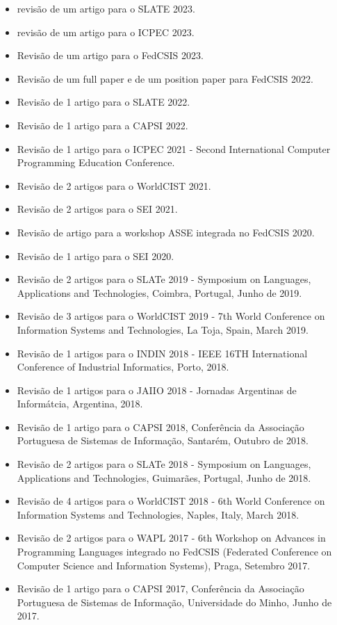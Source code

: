 \documentclass[11pt]{article}
\begin{document}
\begin{itemize}
\item{revisão de um artigo para o SLATE 2023.}
\item{revisão de um artigo para o ICPEC 2023.}
\item{Revisão de um artigo para o FedCSIS 2023.}
\item{Revisão de um full paper e de um position paper para FedCSIS 2022.}
\item{Revisão de 1 artigo para o SLATE 2022.}
\item{Revisão de 1 artigo para a CAPSI 2022.}
\item{Revisão de 1 artigo para o ICPEC 2021 - Second International Computer Programming Education Conference.}
\item{Revisão de 2 artigos para o WorldCIST 2021.}
\item{Revisão de 2 artigos para o SEI 2021.}
\item{Revisão de artigo para a workshop ASSE integrada no FedCSIS 2020.}
\item{Revisão de 1 artigo para o SEI 2020.}
\item{Revisão de 2 artigos para o SLATe 2019 - Symposium on Languages, Applications and Technologies, Coimbra, Portugal, Junho de 2019.}
\item{Revisão de 3 artigos para o WorldCIST 2019 - 7th World Conference on Information Systems and Technologies, La Toja, Spain, March 2019.}
\item{Revisão de 1 artigos para o INDIN 2018 - IEEE 16TH International Conference of Industrial Informatics, Porto, 2018.}
\item{Revisão de 1 artigos para o JAIIO 2018 - Jornadas Argentinas de Informátcia, Argentina, 2018.}
\item{Revisão de 1 artigo para o CAPSI 2018, Conferência da Associação Portuguesa de Sistemas de Informação, Santarém, Outubro de 2018.}
\item{Revisão de 2 artigos para o SLATe 2018 - Symposium on Languages, Applications and Technologies, Guimarães, Portugal, Junho de 2018.}
\item{Revisão de 4 artigos para o WorldCIST 2018 - 6th World Conference on Information Systems and Technologies, Naples, Italy, March 2018.}
\item{Revisão de 2 artigos para o WAPL 2017 - 6th Workshop on Advances in Programming Languages integrado no FedCSIS (Federated Conference on Computer Science and Information Systems), Praga, Setembro 2017.}
\item{Revisão de 1 artigo para o CAPSI 2017, Conferência da Associação Portuguesa de Sistemas de Informação, Universidade do Minho, Junho de 2017.}

\end{itemize}
\end{document}
